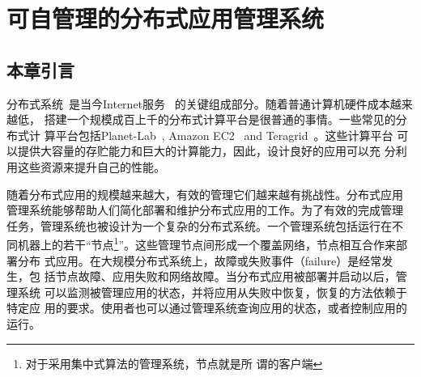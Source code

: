 \chapter{可自管理的分布式应用管理系统}
\label{chap:selfman}


%
%
%
%
%
%
%
%
%
%
%
%

\section{本章引言}

分布式系统~\cite{Ghemawat2003,DeCandia2007}是当今Internet服务~
\cite{google, amazon?}的关键组成部分。随着普通计算机硬件成本越来越低，
搭建一个规模成百上千的分布式计算平台是很普通的事情。一些常见的分布式计
算平台包括Planet-Lab~\cite{Bavier2004}, Amazon
EC2~\cite{Garfinkel2007} and Teragrid~\cite{Catlett2002}。这些计算平台
可以提供大容量的存贮能力和巨大的计算能力，因此，设计良好的应用可以充
分利用这些资源来提升自己的性能。

随着分布式应用的规模越来越大，有效的管理它们越来越有挑战性。分布式应用
管理系统能够帮助人们简化部署和维护分布式应用的工作。为了有效的完成管理
任务，管理系统也被设计为一个复杂的分布式系统。一个管理系统包括运行在不
同机器上的若干“节点\footnote{对于采用集中式算法的管理系统，节点就是所
谓的客户端}”。这些管理节点间形成一个覆盖网络，节点相互合作来部署分布
式应用。在大规模分布式系统上，故障或失败事件（failure）是经常发生，包
括节点故障、应用失败和网络故障。当分布式应用被部署并启动以后，管理系统
可以监测被管理应用的状态，并将应用从失败中恢复，恢复的方法依赖于特定应
用的要求。使用者也可以通过管理系统查询应用的状态，或者控制应用的运行。

